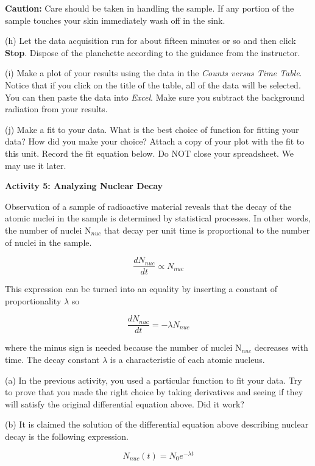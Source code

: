 {\bf Caution:} Care should be taken in handling the sample.
If any portion of the sample touches your skin immediately wash off in the sink.

(h) Let the data acquisition run for about fifteen minutes or so and then click {\bf Stop}.
Dispose of the planchette according to the guidance from the instructor.

(i) Make a plot of your results using the data in the {\it Counts versus Time Table}. 
Notice that if you 
click on the title of the table, all of the
data will be selected. You can then paste the data into {\it Excel}.
Make sure you subtract the background radiation from your results.

(j) Make a fit to your data. What is the best choice of function for fitting 
your data? How did you make your choice?
Attach a copy of your plot with the fit to this unit.
Record the fit equation below.
Do NOT close your spreadsheet. We may use it later.

\vspace{0.5in}

\textbf{Activity 5: Analyzing Nuclear Decay }

Observation of a sample of radioactive material reveals that the decay
of the atomic nuclei in the sample is determined by statistical processes.
In other words, the number of nuclei N\( _{nuc} \) that decay per
unit time is proportional to the number of nuclei in the sample.

\[
\frac{dN_{nuc}}{dt}\propto N_{nuc}\]


This expression can be turned into an equality by inserting a constant
of proportionality \( \lambda  \) so

\[
\frac{dN_{nuc}}{dt}=-\lambda N_{nuc}\]


where the minus sign is needed because the number of nuclei N\( _{nuc} \)
decreases with time. The decay constant \( \lambda  \) is a characteristic
of each atomic nucleus. 

(a) In the previous activity, you used a particular function to fit 
your data.
Try to prove that you made the right choice by taking derivatives and
seeing if they will satisfy the original differential equation above.
Did it work?
\vspace{30mm}

(b) It is claimed the solution of the differential equation above
describing nuclear decay is the following expression.

\[
N_{nuc}(t)=N_{0}e^{-\lambda t}\]


